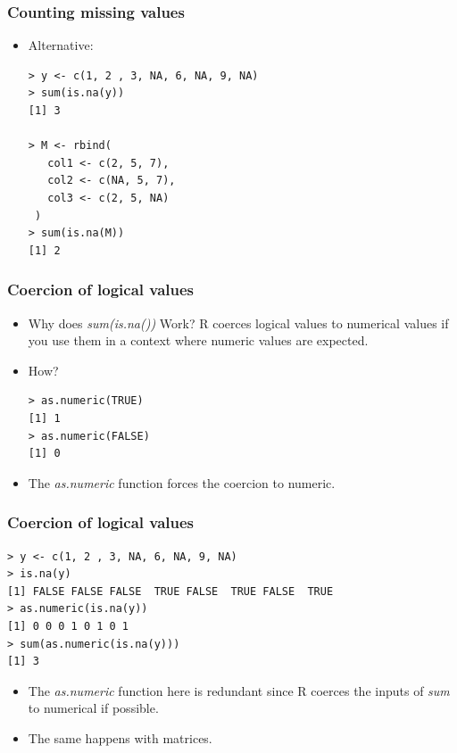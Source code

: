 \documentclass[xcolor=dvipsnames, xcolor=table]{beamer} %
\theoremstyle{mystyle}
\begin{document}
\begin{frame}[fragile] %
\frametitle{Counting missing values}

\begin{itemize}
\item  Alternative: 
\begin{verbatim}
> y <- c(1, 2 , 3, NA, 6, NA, 9, NA)
> sum(is.na(y))
[1] 3

> M <- rbind(
   col1 <- c(2, 5, 7),
   col2 <- c(NA, 5, 7),
   col3 <- c(2, 5, NA)
 )
> sum(is.na(M))
[1] 2
\end{verbatim}
\end{itemize}

\end{frame}

\begin{frame}[fragile] %
\frametitle{Coercion of logical values}

\begin{itemize}
\item  Why does \textit{sum(is.na())} Work? R coerces logical values to numerical values if you use them in a context where numeric values are expected.

\item How?

\begin{verbatim}
> as.numeric(TRUE)
[1] 1
> as.numeric(FALSE)
[1] 0
\end{verbatim}

\item The \textit{as.numeric} function forces the coercion to numeric.

\end{itemize}

\end{frame}

\begin{frame}[fragile] %
\frametitle{Coercion of logical values}

\begin{verbatim}
> y <- c(1, 2 , 3, NA, 6, NA, 9, NA)
> is.na(y)
[1] FALSE FALSE FALSE  TRUE FALSE  TRUE FALSE  TRUE
> as.numeric(is.na(y))
[1] 0 0 0 1 0 1 0 1
> sum(as.numeric(is.na(y)))
[1] 3
\end{verbatim}
\begin{itemize}

\item The \textit{as.numeric} function here is redundant since R coerces the inputs of \textit{sum} to numerical if possible.
\item The same happens with matrices.
\end{itemize}

\end{frame}
\end{document}
